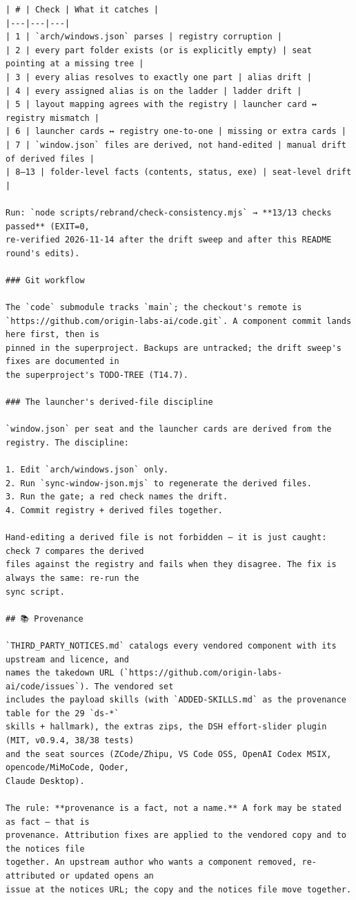 \begin{Verbatim}[breaklines,breakanywhere,fontsize=\footnotesize]
| # | Check | What it catches |
|---|---|---|
| 1 | `arch/windows.json` parses | registry corruption |
| 2 | every part folder exists (or is explicitly empty) | seat pointing at a missing tree |
| 3 | every alias resolves to exactly one part | alias drift |
| 4 | every assigned alias is on the ladder | ladder drift |
| 5 | layout mapping agrees with the registry | launcher card ↔ registry mismatch |
| 6 | launcher cards ↔ registry one-to-one | missing or extra cards |
| 7 | `window.json` files are derived, not hand-edited | manual drift of derived files |
| 8–13 | folder-level facts (contents, status, exe) | seat-level drift |

Run: `node scripts/rebrand/check-consistency.mjs` → **13/13 checks passed** (EXIT=0,
re-verified 2026-11-14 after the drift sweep and after this README round's edits).

### Git workflow

The `code` submodule tracks `main`; the checkout's remote is
`https://github.com/origin-labs-ai/code.git`. A component commit lands here first, then is
pinned in the superproject. Backups are untracked; the drift sweep's fixes are documented in
the superproject's TODO-TREE (T14.7).

### The launcher's derived-file discipline

`window.json` per seat and the launcher cards are derived from the registry. The discipline:

1. Edit `arch/windows.json` only.
2. Run `sync-window-json.mjs` to regenerate the derived files.
3. Run the gate; a red check names the drift.
4. Commit registry + derived files together.

Hand-editing a derived file is not forbidden — it is just caught: check 7 compares the derived
files against the registry and fails when they disagree. The fix is always the same: re-run the
sync script.

## 📚 Provenance

`THIRD_PARTY_NOTICES.md` catalogs every vendored component with its upstream and licence, and
names the takedown URL (`https://github.com/origin-labs-ai/code/issues`). The vendored set
includes the payload skills (with `ADDED-SKILLS.md` as the provenance table for the 29 `ds-*`
skills + hallmark), the extras zips, the DSH effort-slider plugin (MIT, v0.9.4, 38/38 tests)
and the seat sources (ZCode/Zhipu, VS Code OSS, OpenAI Codex MSIX, opencode/MiMoCode, Qoder,
Claude Desktop).

The rule: **provenance is a fact, not a name.** A fork may be stated as fact — that is
provenance. Attribution fixes are applied to the vendored copy and to the notices file
together. An upstream author who wants a component removed, re-attributed or updated opens an
issue at the notices URL; the copy and the notices file move together.


\end{Verbatim}
